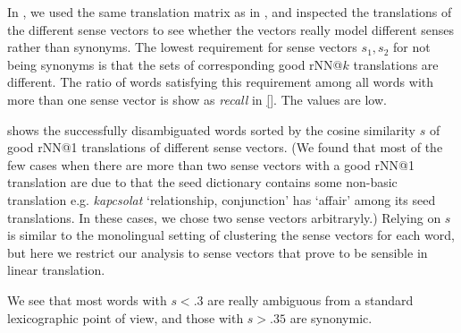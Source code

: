 \documentclass[11pt]{article}
\begin{document}
In \disamb, we used the same translation matrix as in \any, and inspected the
translations of the different sense vectors to see whether the vectors really
model different senses rather than synonyms.
The lowest requirement for sense vectors $s_1, s_2$ for not being synonyms is
that the sets of corresponding good rNN@$k$ translations are different. The
ratio of words satisfying this requirement among all words with more than one
sense vector is show as \emph{recall} in \cref{}. The values are low.


\newcommand{\bad}{$^\text{\frownie}$}

 shows the successfully disambiguated words sorted by the
cosine similarity $s$ of good rNN@1 translations of different sense vectors. (We
found that most of the few cases when there are more than two sense vectors
with a good rNN@1 translation are due to that the seed dictionary contains some
non-basic translation e.g. \emph{kapcsolat} `relationship, conjunction' has
`affair' among its seed translations. In these cases, we chose two sense
vectors arbitraryly.)  Relying on $s$ is similar to the monolingual setting of
clustering the sense vectors for each word, but here we restrict our analysis
to sense vectors that prove to be sensible in linear translation.  

We see that most words with $s<.3$ are really ambiguous from a standard
lexicographic point of view, and those with $s>.35$ are synonymic.
\end{document}
